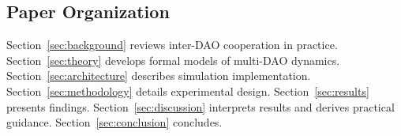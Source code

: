 \subsection{Paper Organization}

Section~\ref{sec:background} reviews inter-DAO cooperation in practice. Section~\ref{sec:theory} develops formal models of multi-DAO dynamics. Section~\ref{sec:architecture} describes simulation implementation. Section~\ref{sec:methodology} details experimental design. Section~\ref{sec:results} presents findings. Section~\ref{sec:discussion} interprets results and derives practical guidance. Section~\ref{sec:conclusion} concludes.
